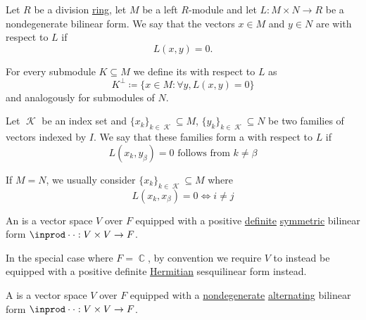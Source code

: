 \begin{definition}\label{def:orthogonality}
  Let \( R \) be a division \hyperref[def:semiring/division_ring]{ring}, let \( M \) be a left \( R \)-module and let \( L: M \times N \to R \) be a nondegenerate bilinear form. We say that the vectors \( x \in M \) and \( y \in N \) are  with respect to \( L \) if
  \begin{equation*}
    L(x, y) = 0.
  \end{equation*}

  For every submodule \( K \subseteq M \) we define its  with respect to \( L \) as
  \begin{equation*}
    K^\perp \coloneqq \{ x \in M \colon \forall y, L(x, y) = 0 \}
  \end{equation*}
  and analogously for submodules of \( N \).

  Let \( \mscrK \) be an index set and \( \{ x_k \}_{k \in \mscrK} \subseteq M \), \( \{ y_k \}_{k \in \mscrK} \subseteq N \) be two families of vectors indexed by \( I \). We say that these families form a  with respect to \( L \) if
  \begin{equation*}
    L(x_k, y_\beta) = 0 \text{ follows from } k \neq \beta
  \end{equation*}

  If \( M = N \), we usually consider  \( \{ x_k \}_{k \in \mscrK} \subseteq M \) where
  \begin{equation*}
    L(x_k, x_\beta) = 0 \iff i \neq j
  \end{equation*}
\end{definition}

\begin{definition}\label{def:inner_product_space}
  An  is a vector space \( V \) over \( F \) equipped with a positive \hyperref[def:quadratic_form_definiteness]{definite} \hyperref[def:bilinear_form/symmetric]{symmetric} bilinear form \( \inprod \cdot \cdot: V \times V \to F \).

  In the special case where \( F = \BbbC \), by convention we require \( V \) to instead be equipped with a positive definite \hyperref[def:sesquilinear_form/hermitian]{Hermitian} sesquilinear form instead.
\end{definition}

\begin{definition}\label{def:symplectic_vector_space}
  A  is a vector space \( V \) over \( F \) equipped with a \hyperref[def:bilinear_form/symmetric]{nondegenerate}  \hyperref[def:bilinear_form/alternating]{alternating} bilinear form \( \inprod \cdot \cdot: V \times V \to F \).
\end{definition}


